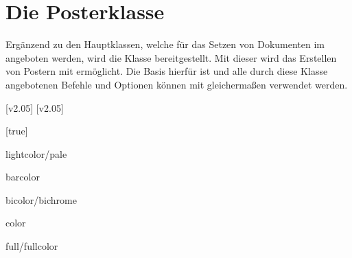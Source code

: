 \chapter[Die Klasse tudscrposter]{Die Posterklasse}
\label{sec:poster}
\begin{Bundle!}[v2.05]{}
%
\printchangedatlist%
%
Ergänzend zu den Hauptklassen, welche für das Setzen von Dokumenten im \TUDCD 
angeboten werden, wird die Klasse  bereitgestellt. Mit 
dieser wird das Erstellen von Postern mit  ermöglicht. Die Basis 
hierfür ist  und alle durch diese Klasse angebotenen Befehle 
und Optionen können mit  gleichermaßen verwendet werden.

[v2.05]
[v2.05]

\begin{Declaration}[v2.05]{}[true]
\printdeclarationlist%
\begin{values}
\itemfalse
{}
\item[lightcolor/pale]
\item[barcolor]
\item[bicolor/bichrome]
\item[color]
\item[full/fullcolor]
\end{values}
\end{Declaration}



\begin{Declaration}[v2.05]{}
\printdeclarationlist%
\end{Declaration}


\end{Bundle!}
